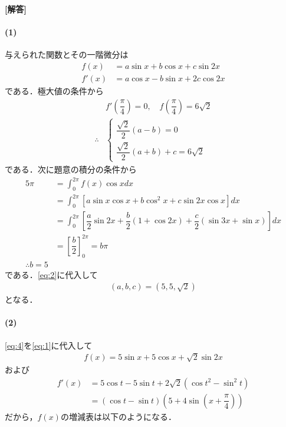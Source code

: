 \documentclass[../../main.tex]{subfiles}
\begin{document}
\begin{oframed}
  
\end{oframed}

{\bf [解答]}

\paragraph{(1)}

与えられた関数とその一階微分は
\begin{align}
  f(x) &= a\sin x + b\cos x + c\sin 2x \\
  f'(x)&=a\cos x-b\sin x+2c\cos 2x \label{eq:1}
\end{align}
である．極大値の条件から
\begin{align}
  &f'\left(\dfrac{\pi}{4}\right)=0, \quad f\left(\dfrac{\pi}{4}\right)=6\sqrt{2} \\
  \therefore
  &
  \begin{cases}
    \dfrac{\sqrt{2}}{2}(a-b)=0 \\
    \dfrac{\sqrt{2}}{2}(a+b)+c=6\sqrt{2}
  \end{cases} \label{eq:2}
\end{align}
である．次に題意の積分の条件から
\begin{align}
  5\pi
  &= \int_{0}^{2\pi}f(x)\cos x dx \\
  &= \int_{0}^{2\pi}\left[a\sin x\cos x + b\cos^2 x + c\sin 2x\cos x \right] dx \\
  &= \int_{0}^{2\pi}\left[\dfrac{a}{2}\sin 2x + \dfrac{b}{2}(1+\cos 2x) + \dfrac{c}{2}(\sin 3x+\sin x) \right] dx  \\
  &= \left[\dfrac{b}{2} \right]_{0}^{2\pi}
  = b\pi \\
  \therefore
  b = 5 \label{eq:3}
\end{align}
である．\cref{eq:2}に代入して
\begin{align}
  (a,b,c)=(5,5,\sqrt{2}) \label{eq:4}
\end{align}
となる．

\paragraph{(2)}

\cref{eq:4}を\cref{eq:1}に代入して
\begin{align}
  f(x) =  5\sin x + 5\cos x + \sqrt{2}\sin 2x
\end{align}
および
\begin{align}
  f'(x)
  &=5\cos t-5\sin t +2\sqrt{2}(\cos t^2-\sin^2 t) \\
  &=(\cos t-\sin t)\left(5+4\sin\left(x+\dfrac{\pi}{4}\right)\right)
\end{align}
だから，$f(x)$の増減表は以下のようになる．
\end{document}
